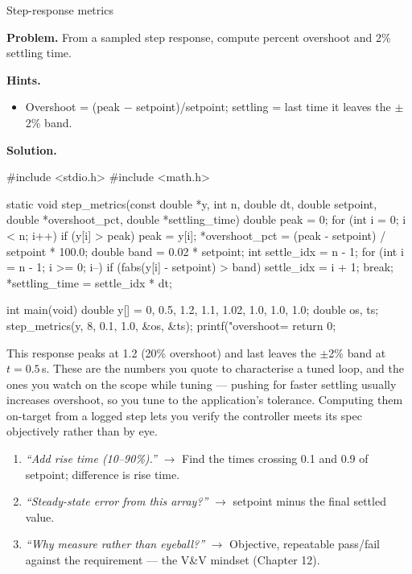 \begin{gymproblem}{Step-response metrics}

\textbf{Problem.} From a sampled step response, compute percent overshoot and
2\% settling time.

\textbf{Hints.}
\begin{itemize}
\item Overshoot = (peak $-$ setpoint)/setpoint; settling = last time it leaves
  the $\pm$2\% band.
\end{itemize}

\attempt

\textbf{Solution.}
\begin{cgym}
#include <stdio.h>
#include <math.h>

static void step_metrics(const double *y, int n, double dt, double setpoint,
                         double *overshoot_pct, double *settling_time) {
    double peak = 0;
    for (int i = 0; i < n; i++) if (y[i] > peak) peak = y[i];
    *overshoot_pct = (peak - setpoint) / setpoint * 100.0;
    double band = 0.02 * setpoint;
    int settle_idx = n - 1;
    for (int i = n - 1; i >= 0; i--)
        if (fabs(y[i] - setpoint) > band) { settle_idx = i + 1; break; }
    *settling_time = settle_idx * dt;
}

int main(void) {
    double y[] = {0, 0.5, 1.2, 1.1, 1.02, 1.0, 1.0, 1.0};
    double os, ts;
    step_metrics(y, 8, 0.1, 1.0, &os, &ts);
    printf("overshoot=%
    return 0;
}
\end{cgym}

This response peaks at 1.2 (20\% overshoot) and last leaves the $\pm$2\% band at
$t=0.5$\,s. These are the numbers you quote to characterise a tuned loop, and the
ones you watch on the scope while tuning --- pushing for faster settling usually
increases overshoot, so you tune to the application's tolerance. Computing them
on-target from a logged step lets you verify the controller meets its spec
objectively rather than by eye.

\followups
\begin{enumerate}
\item \emph{``Add rise time (10--90\%).''} $\rightarrow$ Find the times crossing
  0.1 and 0.9 of setpoint; difference is rise time.
\item \emph{``Steady-state error from this array?''} $\rightarrow$ setpoint
  minus the final settled value.
\item \emph{``Why measure rather than eyeball?''} $\rightarrow$ Objective,
  repeatable pass/fail against the requirement --- the V\&V mindset (Chapter 12).
\end{enumerate}
\end{gymproblem}


